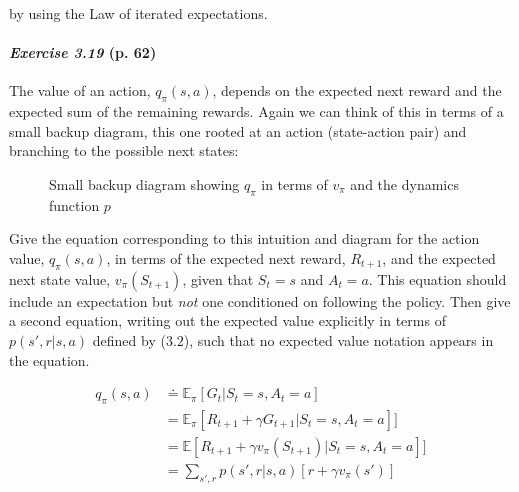 \documentclass[10pt,a4paper]{article}
\begin{document}
by using the Law of iterated expectations.

\paragraph{\textit{Exercise 3.19} (p. 62)} The value of an action, $q_\pi(s, a)$, depends on the expected next reward and
the expected sum of the remaining rewards. Again we can think of this in terms of a
small backup diagram, this one rooted at an action (state-action pair) and branching to
the possible next states:

\begin{figure}[h]
\centering
{}
\caption{Small backup diagram showing $q_\pi$ in terms of $v_\pi$ and the dynamics function $p$}
\label{relation_action_value_state_value}
\end{figure}


Give the equation corresponding to this intuition and diagram for the action value, $q_\pi(s, a)$, in terms of the expected next reward, $R_{t+1}$, and the expected next state value, $v_\pi(S_{t+1})$, given that $S_t=s$ and $A_t=a$. This equation should include an expectation but
\textit{not} one conditioned on following the policy.
Then give a second equation, writing out the expected value explicitly in terms of $p(s', r \lvert s, a)$ defined by ($3.2$), such that no expected value notation appears in the equation.

\bigskip
\begin{equation}
\begin{split}
q_\pi(s, a) &\doteq \mathbb{E}_\pi[G_t \lvert S_t = s, A_t = a] \\
&= \mathbb{E}_\pi[R_{t+1} + \gamma G_{t+1} \lvert S_t = s, A_t = a]]\\
&= \mathbb{E}[R_{t+1} + \gamma v_\pi(S_{t+1}) \lvert S_t = s, A_t = a]]\\
&= \sum_{s', r} p(s', r \lvert s, a) \left[r + \gamma v_\pi(s') \right]
\end{split}
\end{equation}
\end{document}
